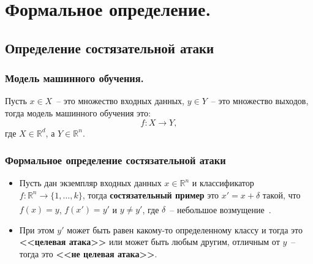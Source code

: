\section{Формальное определение.}

\subsection{Определение состязательной атаки}
\begin{frame}
    \frametitle{Модель машинного обучения.}
    Пусть $x \in X$~-- это множество входных данных, $y \in Y$~-- это множество выходов, тогда модель машинного обучения это:
    \[
        f \colon X \to Y,
    \]
    где $X \in \mathbb{R}^{d}$, а $Y \in \mathbb{R}^{n}$.
\end{frame}

\begin{frame}
    \frametitle{Формальное определение состязательной атаки}
    \begin{definition*}
        \begin{itemize}
            \item Пусть дан экземпляр входных данных $x \in \mathbb{R}^{n}$ и классификатор $f : \mathbb{R}^n \to \{1, \dots, k\}$, тогда \textbf{состязательный пример} это $x' = x + \delta$ такой, что $f(x) = y$, $f(x') = y'$ и $y \neq y'$, где $\delta$~-- небольшое возмущение~\textsuperscript{}.
            \item При этом $y'$ может быть равен какому-то определенному классу и тогда это \textbf{<<целевая атака>>} или может быть любым другим, отличным от $y$~-- тогда это \textbf{<<не целевая атака>>}.
        \end{itemize}
    \end{definition*}
\end{frame}

